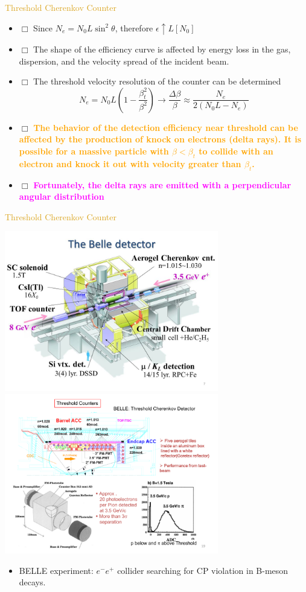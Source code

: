 \documentclass[11pt]{beamer} %
\renewcommand{\(}{\begin{columns}}
\renewcommand{\)}{\end{columns}}
\newcommand{\<}[1]{\begin{column}{#1}}
\renewcommand{\>}{\end{column}}
\newcommand{\itt}{\begin{itemize}}
\newcommand{\tti}{\end{itemize}}
\newcommand{\hlt}[2]{\textcolor{#1}{\textbf{#2}}}
\begin{document}
\begin{frame}{\textcolor{Goldenrod}{Threshold Cherenkov Counter}}
  \itt
\item[$\Box$] Since $N_e = N_0 L \sin^2\theta$, therefore $\epsilon
  \uparrow L[N_0] $
\item[$\Box$] The shape of the efficiency curve is affected by energy
  loss in the gas, dispersion, and the velocity spread of the incident
  beam.
\item[$\Box$] The threshold velocity resolution of the counter can be
  determined
  \[ N_e = N_0 L (1- \frac{\beta^2_t}{\beta^2}) \to
    \frac{\Delta\beta}{\beta}\approx \frac{N_e}{2(N_0L - N_e)}
  \]
\item[$\Box$] \hlt{Orange}{The behavior of the detection efficiency
    near threshold can be affected by the production of knock on electrons
    (delta rays). It is possible for a massive particle with $\beta <
    \beta_t$ to collide with an electron and knock it out with velocity
    greater than $\beta_t$.}
\item[$\Box$] \hlt{Magenta}{Fortunately, the delta rays are emitted with a
  perpendicular angular distribution}
  \tti
\end{frame}
\begin{frame}{\textcolor{Goldenrod}{Threshold Cherenkov Counter}}
  \begin{center}
  \includegraphics[width=0.7\textwidth,
  height=0.45\textheight]{./Images/Belle_detector_01}\\
  \includegraphics[width=0.7\textwidth,
  height=0.35\textheight]{./Images/Belle_detector_02}\\
  \end{center}
  
  \itt
  \item BELLE experiment: $e^-e^+$ collider  searching for CP violation in
    B-meson decays.
  \tti
\end{frame}
\end{document}
